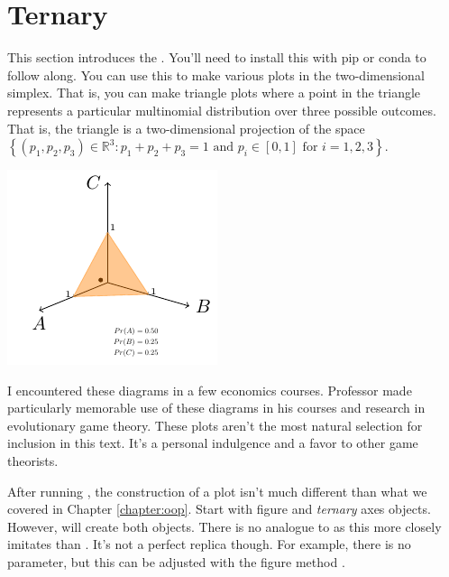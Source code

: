 \section{Ternary}

This section introduces the . You'll need to install this with pip or conda to follow along. You can use this to make various plots in the two-dimensional simplex. That is, you can make triangle plots where a point in the triangle represents a particular multinomial distribution over three possible outcomes. That is, the triangle is a two-dimensional projection of the space $\left\{ \left(p_1,p_2,p_3 \right)\in \mathbb{R}^3: p_1+p_2+p_3 = 1 \text{ and } p_i \in [0,1] \text{ for }i=1,2,3 \right\}.$

\begin{center}
    \includegraphics[width = .6\textwidth]{images/tikz_simplex_blank.pdf}
\end{center}

I encountered these diagrams in a few economics courses. Professor  made particularly memorable use of these diagrams in his courses and research in evolutionary game theory. These plots aren't the most natural selection for inclusion in this text. It's a personal indulgence and a favor to other game theorists.

After running , the construction of a plot isn't much different than what we covered in Chapter \ref{chapter:oop}. Start with figure and
\emph{ternary} axes objects. However,  will create both objects. There is no analogue to  as this more closely imitates  than . It's not a perfect replica though. For example, there is no  parameter, but this can be adjusted with the figure method .

